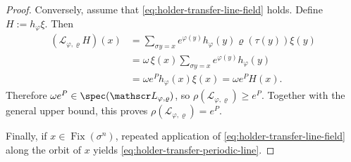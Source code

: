 \begin{proof}
  Conversely, assume that \eqref{eq:holder-transfer-line-field} holds.
  Define \(H:=h_\varphi\xi\). Then
  \begin{align*}
    (\mathscr L_{\varphi,\varrho}H)(x)
    &=
    \sum_{\sigma y=x}
      e^{\varphi(y)}h_\varphi(y)\varrho(\tau(y))\xi(y) \\
    &=
    \omega\,\xi(x)\sum_{\sigma y=x}e^{\varphi(y)}h_\varphi(y) \\
    &=
    \omega e^P h_\varphi(x)\xi(x)
    =\omega e^P H(x).
  \end{align*}
  Therefore \(\omega e^P\in\spec(\mathscr L_{\varphi,\varrho})\), so
  \(\rho(\mathscr L_{\varphi,\varrho})\ge e^P\). Together with the
  general upper bound, this proves
  \(\rho(\mathscr L_{\varphi,\varrho})=e^P\).

  Finally, if \(x\in\operatorname{Fix}(\sigma^n)\), repeated application
  of \eqref{eq:holder-transfer-line-field} along the orbit of \(x\)
  yields \eqref{eq:holder-transfer-periodic-line}.
\end{proof}
